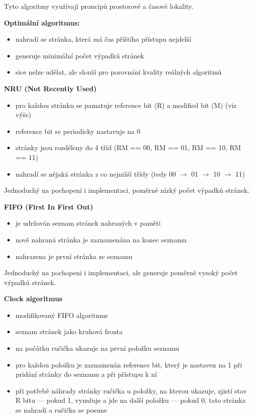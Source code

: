 Tyto algoritmy využívají proncipů prostorové a časové lokality.

\textbf{Optimální algoritmus:}
\begin{itemize}
	\item nahradí se stránka, která má čas příštího přístupu nejdelší
	\item generuje minimální počet výpadků stránek
	\item sice nelze udělat, ale slouží pro porovnání kvality reálných algoritmů
\end{itemize}

\textbf{NRU (Not Recently Used)}
\begin{itemize}
	\item pro každou stránku se pamatuje reference bit (R) a modified bit (M) (viz výše)
	\item reference bit se periodicky nastavuje na 0
	\item stránky jsou rozděleny do 4 tříd (RM == 00, RM == 01, RM == 10, RM == 11)
	\item nahradí se nějaká stránka z co nejnižší třídy (tedy 00 $\rightarrow$ 01 $\rightarrow$ 10 $\rightarrow$ 11)
\end{itemize}

Jednoduchý na pochopení i implementaci, poměrně nízký počet výpadků stránek.

\textbf{FIFO (First In First Out)}
\begin{itemize}
	\item je udržován seznam stránek nahraných v paměti
	\item nově nahraná stránka je zaznamenána na konec seznamu
	\item nahrazena je první stránka ze seznamu
\end{itemize}

Jednoduchý na pochopení i implementaci, ale generuje poměrně vysoký počet výpadků stránek.

\textbf{Clock algoritmus}
\begin{itemize}
	\item modifikovaný FIFO algoritmus
	\item seznam stránek jako kruhová fronta
	\item na počátku ručička ukazuje na první položku seznamu
	\item pro každou položku je zaznamenán reference bit, který je nastaven na 1 při pridání stránky do seznamu a při přístupu k ní
	\item při potřebě náhrady stránky ručička u položky, na kterou ukazuje, zjistí stav R bitu --- pokud 1, vynuluje a jde na další položku --- pokud 0, tato stránka se nahradí a ručička se posune
\end{itemize}

